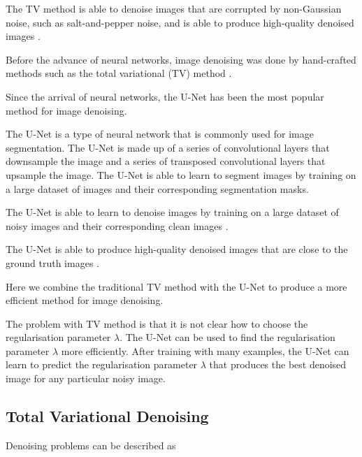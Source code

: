 \documentclass[12pt]{article}
\begin{document}
The TV method is able to denoise images that are corrupted by non-Gaussian noise, such as salt-and-pepper noise, and is able to produce high-quality denoised images \cite{rudin1992nonlinear}.

Before the advance of neural networks, image denoising was done by hand-crafted methods such as the total variational (TV) method \cite{rudin1992nonlinear}.

Since the arrival of neural networks, the U-Net has been the most popular method for image denoising.

The U-Net is a type of neural network that is commonly used for image segmentation.
The U-Net is made up of a series of convolutional layers that downsample the image and a series of transposed convolutional layers that upsample the image.
The U-Net is able to learn to segment images by training on a large dataset of images and their corresponding segmentation masks.

The U-Net is able to learn to denoise images by training on a large dataset of noisy images and their corresponding clean images \cite{ronneberger2015u}.

The U-Net is able to produce high-quality denoised images that are close to the ground truth images \cite{ronneberger2015u}.

Here we combine the traditional TV method with the U-Net to produce a more efficient method for image denoising.

The problem with TV method is that it is not clear how to choose the regularisation parameter $\lambda$.
The U-Net can be used to find the regularisation parameter $\lambda$ more efficiently.
After training with many examples, the U-Net can learn to predict the regularisation parameter $\lambda$ that produces the best denoised image for any particular noisy image.






\subsection{Total Variational Denoising}

Denoising problems can be described as 
\end{document}
